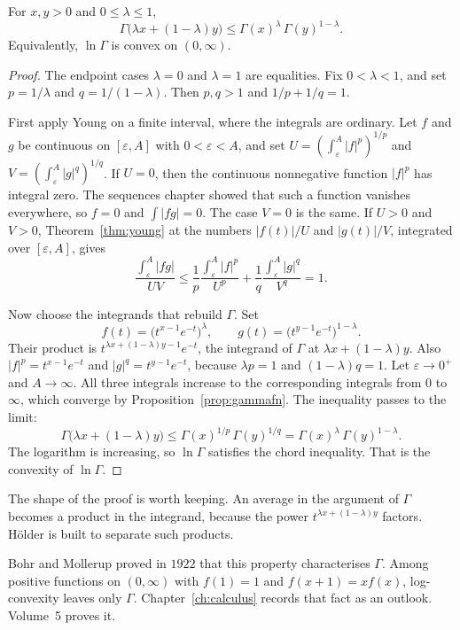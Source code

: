 \begin{proposition}\label{prop:gamma-convexity}
For $x,y>0$ and $0\le\lambda\le1$,
\[
\Gamma\bigl(\lambda x+(1-\lambda)y\bigr)\le\Gamma(x)^\lambda\,\Gamma(y)^{1-\lambda}.
\]
Equivalently, $\ln\Gamma$ is convex on $(0,\infty)$.
\end{proposition}
\begin{proof}
The endpoint cases $\lambda=0$ and $\lambda=1$ are equalities. Fix $0<\lambda<1$, and set $p=1/\lambda$ and $q=1/(1-\lambda)$. Then $p,q>1$ and $1/p+1/q=1$.

First apply Young on a finite interval, where the integrals are ordinary. Let $f$ and $g$ be continuous on $[\varepsilon,A]$ with $0<\varepsilon<A$, and set $U=(\int_\varepsilon^A|f|^p)^{1/p}$ and $V=(\int_\varepsilon^A|g|^q)^{1/q}$. If $U=0$, then the continuous nonnegative function $|f|^p$ has integral zero. The sequences chapter showed that such a function vanishes everywhere, so $f=0$ and $\int|fg|=0$. The case $V=0$ is the same. If $U>0$ and $V>0$, Theorem~\ref{thm:young} at the numbers $|f(t)|/U$ and $|g(t)|/V$, integrated over $[\varepsilon,A]$, gives
\[
\frac{\int_\varepsilon^A|fg|}{UV}\le\frac1p\frac{\int_\varepsilon^A|f|^p}{U^p}+\frac1q\frac{\int_\varepsilon^A|g|^q}{V^q}=1.
\]

Now choose the integrands that rebuild $\Gamma$. Set
\[
f(t)=\bigl(t^{x-1}e^{-t}\bigr)^\lambda,\qquad g(t)=\bigl(t^{y-1}e^{-t}\bigr)^{1-\lambda}.
\]
Their product is $t^{\lambda x+(1-\lambda)y-1}e^{-t}$, the integrand of $\Gamma$ at $\lambda x+(1-\lambda)y$. Also $|f|^p=t^{x-1}e^{-t}$ and $|g|^q=t^{y-1}e^{-t}$, because $\lambda p=1$ and $(1-\lambda)q=1$. Let $\varepsilon\to0^+$ and $A\to\infty$. All three integrals increase to the corresponding integrals from $0$ to $\infty$, which converge by Proposition~\ref{prop:gammafn}. The inequality passes to the limit:
\[
\Gamma\bigl(\lambda x+(1-\lambda)y\bigr)\le\Gamma(x)^{1/p}\,\Gamma(y)^{1/q}=\Gamma(x)^\lambda\,\Gamma(y)^{1-\lambda}.
\]
The logarithm is increasing, so $\ln\Gamma$ satisfies the chord inequality. That is the convexity of $\ln\Gamma$.
\end{proof}

The shape of the proof is worth keeping. An average in the argument of $\Gamma$ becomes a product in the integrand, because the power $t^{\lambda x+(1-\lambda)y}$ factors. H\"older is built to separate such products.

Bohr and Mollerup proved in $1922$ that this property characterises $\Gamma$. Among positive functions on $(0,\infty)$ with $f(1)=1$ and $f(x+1)=xf(x)$, log-convexity leaves only $\Gamma$. Chapter~\ref{ch:calculus} records that fact as an outlook. Volume~5 proves it.

